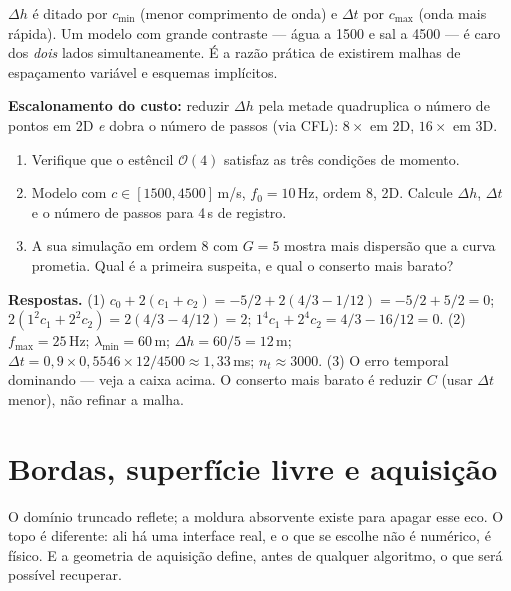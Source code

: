 \documentclass[11pt,a4paper,oneside]{report}
\begin{document}
\begin{atencao}
$\Delta h$ \'e ditado por $c_{\min}$ (menor comprimento de onda) e $\Delta t$
por $c_{\max}$ (onda mais r\'apida). Um modelo com grande contraste --- \'agua
a 1500 e sal a 4500 --- \'e caro dos \emph{dois} lados simultaneamente. \'E a
raz\~ao pr\'atica de existirem malhas de espa\c{c}amento vari\'avel e esquemas
impl\'icitos.
\end{atencao}

\textbf{Escalonamento do custo:} reduzir $\Delta h$ pela metade quadruplica o
n\'umero de pontos em 2D \emph{e} dobra o n\'umero de passos (via CFL):
$8\times$ em 2D, $16\times$ em 3D.

\begin{exercicio}
\begin{enumerate}[leftmargin=*, itemsep=2pt]
\item Verifique que o est\^encil $\mathcal{O}(4)$ satisfaz as tr\^es
condi\c{c}\~oes de momento.
\item Modelo com $c \in [1500, 4500]$\,m/s, $f_0 = 10$\,Hz, ordem 8, 2D.
Calcule $\Delta h$, $\Delta t$ e o n\'umero de passos para 4\,s de registro.
\item A sua simula\c{c}\~ao em ordem 8 com $G = 5$ mostra mais dispers\~ao que
a curva prometia. Qual \'e a primeira suspeita, e qual o conserto mais barato?
\end{enumerate}
\textbf{Respostas.} (1) $c_0 + 2(c_1+c_2) = -5/2 + 2(4/3 - 1/12) = -5/2 + 5/2
= 0$; $2(1^2 c_1 + 2^2 c_2) = 2(4/3 - 4/12) = 2$; $1^4 c_1 + 2^4 c_2 =
4/3 - 16/12 = 0$. (2) $f_{\max}=25$\,Hz; $\lambda_{\min}=60$\,m;
$\Delta h = 60/5 = 12$\,m; $\Delta t = 0{,}9\times0{,}5546\times12/4500
\approx 1{,}33$\,ms; $n_t \approx 3000$. (3) O erro temporal dominando ---
veja a caixa acima. O conserto mais barato \'e reduzir $C$ (usar $\Delta t$
menor), n\~ao refinar a malha.
\end{exercicio}

\chapter{Bordas, superf\'icie livre e aquisi\c{c}\~ao}
\label{cap:bordas}

\begin{ideia}
O dom\'inio truncado reflete; a moldura absorvente existe para apagar esse
eco. O topo \'e diferente: ali h\'a uma interface real, e o que se escolhe
n\~ao \'e num\'erico, \'e f\'isico. E a geometria de aquisi\c{c}\~ao define,
antes de qualquer algoritmo, o que ser\'a poss\'ivel recuperar.
\end{ideia}
\end{document}
